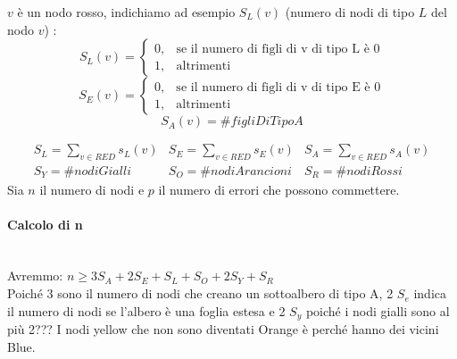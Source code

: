 $v$ è un nodo rosso, indichiamo ad esempio $S_L(v)$ (numero di nodi di tipo $L$ del
nodo $v$) :
\begin{equation*}
    S_L(v) = \begin{cases} 0, & \mbox{se il numero di figli di v di tipo L è 0} \\
              1, & \mbox{altrimenti}\end{cases}
\end{equation*}
\begin{equation*}
    S_E(v) = \begin{cases} 0, & \mbox{se il numero di figli di v di tipo E è 0} \\
              1, & \mbox{altrimenti}\end{cases}
\end{equation*}
\begin{equation*}
    S_A(v) = \#figliDiTipo A
\end{equation*}

\begin{equation}
    \begin{array}{ccc}
        S_L = \sum_{v \in RED} s_L(v) &
        S_E = \sum_{v \in RED} s_E(v) &
        S_A = \sum_{v \in RED} s_A(v)   \\
        S_Y = \#nodiGialli            &
        S_O = \#nodiArancioni         &
        S_R = \#nodiRossi
    \end{array}
\end{equation}
Sia $n$ il numero di nodi e $p$ il numero di errori che possono commettere.
\paragraph{Calcolo di n}\ \\
Avremmo: $n \geq 3 S_A + 2 S_E + S_L + S_O + 2 S_Y + S_R$\\
Poiché 3 sono il numero di nodi che creano un sottoalbero di tipo A, 2 $S_e$
indica il numero di nodi se l'albero è una foglia estesa e 2 $S_y$ poiché i nodi
gialli sono al più 2??? I nodi yellow che non sono diventati Orange è perché
hanno dei vicini Blue.
